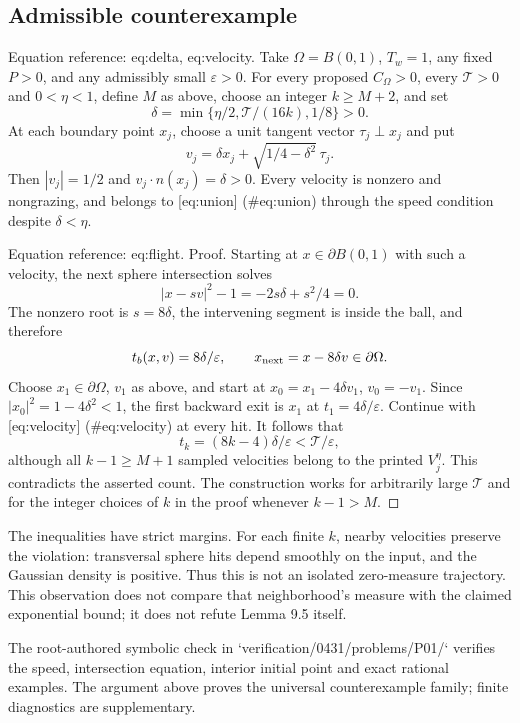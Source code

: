 \documentclass[10pt]{article}
\begin{document}
\subsection*{Admissible counterexample}
Equation reference: eq:delta, eq:velocity. Take \(\Omega=B(0,1)\), \(T_w=1\), any fixed \(P>0\), and any admissibly small \(\varepsilon>0\). For every proposed \(C_\Omega>0\), every \(\mathcal T>0\) and \(0<\eta<1\), define \(M\) as above, choose an integer \(k\ge M+2\), and set \[
 \delta=\min\{\eta/2,\mathcal T/(16k),1/8\}>0.\] At each boundary point \(x_j\), choose a unit tangent vector \(\tau_j\perp x_j\) and put \[
 v_j=\delta x_j+\sqrt{1/4-\delta^2}\,\tau_j.\] Then \(|v_j|=1/2\) and \(v_j\cdot n(x_j)=\delta>0\). Every velocity is nonzero and nongrazing, and belongs to [eq:union] (\#eq:union) through the speed condition despite \(\delta<\eta\).\par
Equation reference: eq:flight. Proof. Starting at \(x\in\partial B(0,1)\) with such a velocity, the next sphere intersection solves \[|x-sv|^2-1=-2s\delta+s^2/4=0.\] The nonzero root is \(s=8\delta\), the intervening segment is inside the ball, and therefore \[
 t_b(x,v)=8\delta/\varepsilon,\qquad
 x_{\rm next}=x-8\delta v\in\partial\Omega.\] Choose \(x_1\in\partial\Omega\), \(v_1\) as above, and start at \(x_0=x_1-4\delta v_1\), \(v_0=-v_1\). Since \(|x_0|^2=1-4\delta^2<1\), the first backward exit is \(x_1\) at \(t_1=4\delta/\varepsilon\). Continue with [eq:velocity] (\#eq:velocity) at every hit. It follows that \[t_k=(8k-4)\delta/\varepsilon<\mathcal T/\varepsilon,\] although all \(k-1\ge M+1\) sampled velocities belong to the printed \(V_j^\eta\). This contradicts the asserted count. The construction works for arbitrarily large \(\mathcal T\) and for the integer choices of \(k\) in the proof whenever \(k-1>M\). ◻\par
The inequalities have strict margins. For each finite \(k\), nearby velocities preserve the violation: transversal sphere hits depend smoothly on the input, and the Gaussian density is positive. Thus this is not an isolated zero-measure trajectory. This observation does not compare that neighborhood’s measure with the claimed exponential bound; it does not refute Lemma 9.5 itself.\par
The root-authored symbolic check in `verification/0431/problems/P01/` verifies the speed, intersection equation, interior initial point and exact rational examples. The argument above proves the universal counterexample family; finite diagnostics are supplementary.\par
\end{document}
